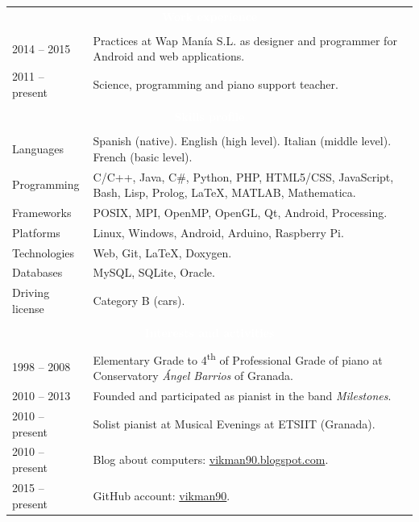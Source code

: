 \documentclass[12pt,a4paper]{article}
\newcommand{\header}[1]{\multicolumn{2}{c}{\cellcolor{black} \textcolor{white} {#1}} \\}
\begin{document}
		\begin{tabular}{p{}p{}}
		\header{\textbf{Work experience}}
		\\
		2014 -- 2015 & Practices at Wap Manía S.L. as designer and programmer 
		for Android and web applications. \\	
		2011 -- present & Science, programming and piano support teacher. \\
		\\
		\header{\textbf{Skills profile}}
		\\
		Languages & Spanish (native). \newline
		English (high level). \newline
		Italian (middle level). \newline
		French (basic level). \\
		Programming & C/C++, Java, C\#, Python, PHP, HTML5/CSS, JavaScript, 
		Bash, Lisp, Prolog, LaTeX, MATLAB, Mathematica. \\
		Frameworks & POSIX, MPI, OpenMP, OpenGL, Qt, Android, Processing. \\
		Platforms & Linux, Windows, Android, Arduino, Raspberry Pi. \\
		Technologies & Web, Git, LaTeX, Doxygen. \\
		Databases & MySQL, SQLite, Oracle. \\
		Driving license & Category B (cars). \\
		\\
		\header{\textbf{Interests and activities}}
		\\
		1998 -- 2008 & Elementary Grade to 4\textsuperscript{th} of Professional
		Grade of piano at Conservatory \textit{Ángel Barrios} of Granada. \\
		2010 -- 2013 & Founded and participated as pianist in the band 
		\textit{Milestones}. \\
		2010 -- present & Solist pianist at Musical Evenings at ETSIIT (Granada). \\
		2010 -- present & Blog about computers: 
		\href{http://vikman90.blogspot.com}{vikman90.blogspot.com}. \\
		2015 -- present & GitHub account: 
		\href{https://github.com/vikman90}{vikman90}. \\
	\end{tabular}
\end{document}

